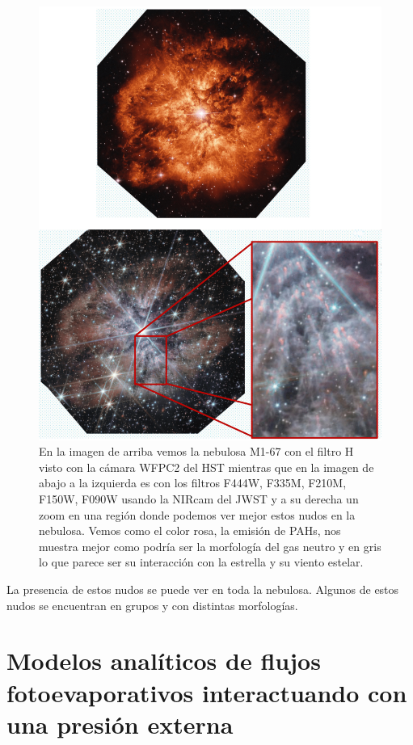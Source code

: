 \documentclass{book}
\begin{document}
\begin{figure}[h]
    \centering
    \includegraphics[width=\textwidth]{images Chapter 1/c1WR.png}
    \caption{En la imagen de arriba vemos la nebulosa M1-67 con el filtro \unit{H\alpha} visto con la cámara WFPC2 del HST mientras que en la imagen de abajo a la izquierda es con los filtros F444W, F335M, F210M, F150W, F090W usando la NIRcam del JWST y a su derecha un zoom en una región donde podemos ver mejor estos nudos en la nebulosa. Vemos como el color rosa, la emisión de PAHs, nos muestra mejor como podría ser la morfología del gas neutro y en gris lo que parece ser su interacción con la estrella y su viento estelar.}
    \label{fig:nudos WR124}
\end{figure}

La presencia de estos nudos se puede ver en toda la nebulosa. Algunos de estos nudos se encuentran en grupos y con distintas morfologías. 

\chapter{Modelos analíticos de flujos fotoevaporativos interactuando con una presión externa}
\end{document}

